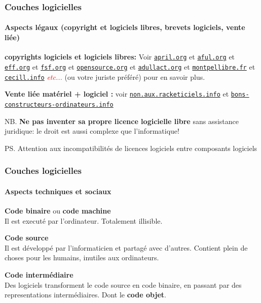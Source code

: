 \documentclass[xcolor=svgnames,final,smaller,a4]{beamer}
\begin{document}
\begin{frame}
  \frametitle{Couches logicielles}
  \framesubtitle{Aspects légaux (copyright et logiciels libres, brevets logiciels, vente liée)}

  \textbf{copyrights logiciels et logiciels libres:} Voir
  \href{https://april.org/}{\texttt{april.org}} et
  \href{https://aful.org/}{\texttt{aful.org}} et
  \href{https://www.eff.org/}{\texttt{eff.org}} et
  \href{https://www.fsf.org/}{\texttt{fsf.org}} et
  \href{https://opensource.org/}{\texttt{opensource.org}} et
   \href{https://adullact.org/}{\texttt{adullact.org}} et
  \href{https://montpellibre.fr/}{\texttt{montpellibre.fr}} et
   \href{https://cecill.info/}{\texttt{cecill.info}} \textcolor{red}{\textit{etc...}}
  (ou votre juriste préféré)
    pour en savoir
    plus.

    \vspace{0.5cm}
    \textbf{Vente liée matériel + logiciel :} voir
    \href{https://non.aux.racketiciels.info/}{\texttt{non.aux.racketiciels.info}}
    et
    \href{https://bons-constructeurs-ordinateurs.info/}{\texttt{bons-constructeurs-ordinateurs.info}}
    
    \vspace{0.5cm}

    NB. \textbf{Ne pas inventer sa propre licence logicielle libre} sans
    assistance juridique: le droit est aussi complexe que
    l'informatique!
   
    \vspace{0.3cm}
 
    PS. Attention aux incompatibilités de licences logiciels entre composants logiciels
\end{frame}


\begin{frame}
  \frametitle{Couches logicielles}
  \framesubtitle{Aspects techniques et sociaux}

  \textbf{Code binaire} ou \textbf{code machine} \\
  Il est executé par l'ordinateur. Totalement illisible.

    \vspace{0.3cm}
  \textbf{Code source} \\
  Il est développé par l'informaticien et partagé avec d'autres. Contient plein de choses pour les humains, inutiles aux ordinateurs.

    \vspace{0.3cm}
  \textbf{Code intermédiaire} \\
  Des logiciels transforment le code source en code binaire, en passant par des representations intermédiaires. Dont le  \textbf{code objet}.
  
\end{frame}
\end{document}
